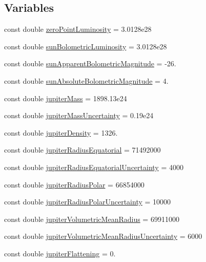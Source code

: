 \subsection*{Variables}
\begin{DoxyCompactItemize}
\item 
const double \mbox{\hyperlink{namespace_e_g_x_phys_a18031fe471e11fca968a34ecea8aafdb}{zero\+Point\+Luminosity}} = 3.\+0128e28
\item 
const double \mbox{\hyperlink{namespace_e_g_x_phys_a7255d70600ab43d9a7b2544400e6da79}{sun\+Bolometric\+Luminosity}} = 3.\+0128e28
\item 
const double \mbox{\hyperlink{namespace_e_g_x_phys_a955fc5381e15741484ffe146d8eccdd8}{sun\+Apparent\+Bolometric\+Magnitude}} = -\/26.
\item 
const double \mbox{\hyperlink{namespace_e_g_x_phys_a4ac32f61eb3abee399574dc1acc51b4b}{sun\+Absolute\+Bolometric\+Magnitude}} = 4.
\item 
const double \mbox{\hyperlink{namespace_e_g_x_phys_ab0b29a904521663fd0452458f3e06891}{jupiter\+Mass}} = 1898.\+13e24
\item 
const double \mbox{\hyperlink{namespace_e_g_x_phys_ab16070b1d99b54cfb6f2f9ee9250fb14}{jupiter\+Mass\+Uncertainty}} = 0.\+19e24
\item 
const double \mbox{\hyperlink{namespace_e_g_x_phys_a75f9f5d512c3c8c64755daa1cfb433c7}{jupiter\+Density}} = 1326.
\item 
const double \mbox{\hyperlink{namespace_e_g_x_phys_ade1d97dbbb33f1c2345c24ebea67e21f}{jupiter\+Radius\+Equatorial}} = 71492000
\item 
const double \mbox{\hyperlink{namespace_e_g_x_phys_a8438593703b79e6685c954b478947faf}{jupiter\+Radius\+Equatorial\+Uncertainty}} = 4000
\item 
const double \mbox{\hyperlink{namespace_e_g_x_phys_ab803b5a7ef7f6dd4a925ebcbc6af61a1}{jupiter\+Radius\+Polar}} = 66854000
\item 
const double \mbox{\hyperlink{namespace_e_g_x_phys_a0340e326f1ae054e922ba82da4ee4b25}{jupiter\+Radius\+Polar\+Uncertainty}} = 10000
\item 
const double \mbox{\hyperlink{namespace_e_g_x_phys_a2854b5f809f290c9d1cfa786cd614e86}{jupiter\+Volumetric\+Mean\+Radius}} = 69911000
\item 
const double \mbox{\hyperlink{namespace_e_g_x_phys_a8e16665678753a048bc6bdfbffe514bd}{jupiter\+Volumetric\+Mean\+Radius\+Uncertainty}} = 6000
\item 
const double \mbox{\hyperlink{namespace_e_g_x_phys_a6aa6094f390c1057f98af6d049a0f853}{jupiter\+Flattening}} = 0.

\end{DoxyCompactItemize}
